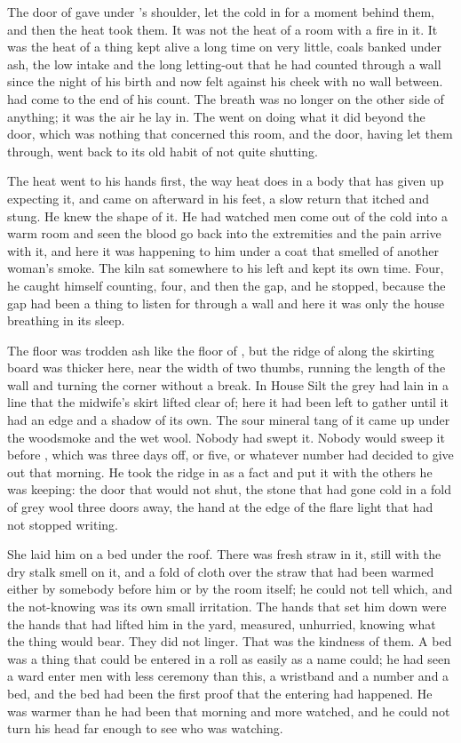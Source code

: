 The door of  gave under 's shoulder, let the cold in for a moment behind them, and then the heat took them. It was not the heat of a room with a fire in it. It was the heat of a thing kept alive a long time on very little, coals banked under ash, the low intake and the long letting-out that he had counted through a wall since the night of his birth and now felt against his cheek with no wall between.  had come to the end of his count. The breath was no longer on the other side of anything; it was the air he lay in. The  went on doing what it did beyond the door, which was nothing that concerned this room, and the door, having let them through, went back to its old habit of not quite shutting.

The heat went to his hands first, the way heat does in a body that has given up expecting it, and came on afterward in his feet, a slow return that itched and stung. He knew the shape of it. He had watched men come out of the cold into a warm room and seen the blood go back into the extremities and the pain arrive with it, and here it was happening to him under a coat that smelled of another woman's smoke. The kiln sat somewhere to his left and kept its own time. Four, he caught himself counting, four, and then the gap, and he stopped, because the gap had been a thing to listen for through a wall and here it was only the house breathing in its sleep.

The floor was trodden ash like the floor of , but the ridge of  along the skirting board was thicker here, near the width of two thumbs, running the length of the wall and turning the corner without a break. In House Silt the grey had lain in a line that the midwife's skirt lifted clear of; here it had been left to gather until it had an edge and a shadow of its own. The sour mineral tang of it came up under the woodsmoke and the wet wool. Nobody had swept it. Nobody would sweep it before , which was three days off, or five, or whatever number  had decided to give out that morning. He took the ridge in as a fact and put it with the others he was keeping: the door that would not shut, the stone that had gone cold in a fold of grey wool three doors away, the hand at the edge of the flare light that had not stopped writing.

She laid him on a bed under the roof. There was fresh straw in it, still with the dry stalk smell on it, and a fold of cloth over the straw that had been warmed either by somebody before him or by the room itself; he could not tell which, and the not-knowing was its own small irritation. The hands that set him down were the hands that had lifted him in the yard, measured, unhurried, knowing what the thing would bear. They did not linger. That was the kindness of them. A bed was a thing that could be entered in a roll as easily as a name could; he had seen a ward enter men with less ceremony than this, a wristband and a number and a bed, and the bed had been the first proof that the entering had happened. He was warmer than he had been that morning and more watched, and he could not turn his head far enough to see who was watching.

